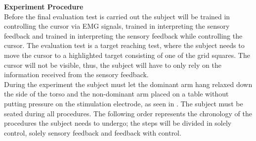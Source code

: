 \noindent\textbf{{\Large Experiment Procedure}} \\
\newline
Before the final evaluation test is carried out the subject will be trained in controlling the cursor via EMG signals, trained in interpreting the sensory feedback and trained in interpreting the sensory feedback while controlling the cursor. The evaluation test is a target reaching test, where the subject needs to move the cursor to a highlighted target consisting of one of the grid squares. The cursor will not be visible, thus, the subject will have to only rely on the information received from the sensory feedback. \\
During the experiment the subject must let the dominant arm hang relaxed down the side of the torso and the non-dominant arm placed on a table without putting pressure on the stimulation electrode, as seen in . The subject must be seated during all procedures. The following order represents the chronology of the procedures the subject needs to undergo; the steps will be divided in solely control, solely sensory feedback and feedback with control. 


